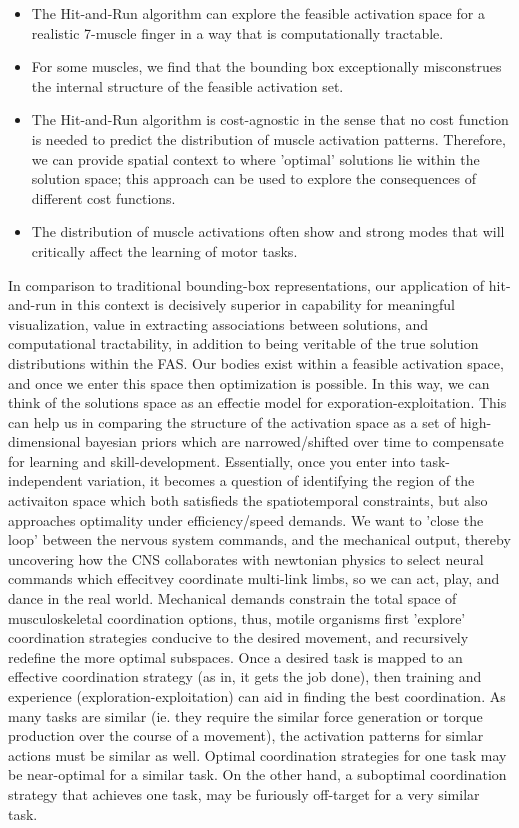 \begin{itemize}
	\item{The Hit-and-Run algorithm can explore the feasible activation space for a realistic 7-muscle finger in a way that is computationally tractable.}
	\item{For some muscles, we find that the bounding box exceptionally misconstrues the internal structure of the feasible activation set.}
	\item{The Hit-and-Run algorithm is cost-agnostic in the sense that no cost function is needed to predict the distribution of muscle activation patterns. Therefore, we can provide spatial context to where 'optimal' solutions lie within the solution space; this approach can be used to explore the consequences of different cost functions.}
	\item{The distribution of muscle activations often show and strong modes that will critically affect the learning of motor tasks.}
\end{itemize}
In comparison to traditional bounding-box representations, our application of hit-and-run in this context is decisively superior in capability for meaningful visualization, value in extracting associations between solutions, and computational tractability, in addition to being veritable of the true solution distributions within the FAS. Our bodies exist within a feasible activation space, and once we enter this space then optimization is possible. In this way, we can think of the solutions space as an effectie model for exporation-exploitation.
This can help us in comparing the structure of the activation space as a set of high-dimensional bayesian priors which are narrowed/shifted over time to compensate for learning and skill-development.
Essentially, once you enter into task-independent variation, it becomes a question of identifying the region of the activaiton space which both satisfieds the spatiotemporal constraints, but also approaches optimality under efficiency/speed demands.
We want to 'close the loop' between the nervous system commands, and the mechanical output, thereby uncovering how the CNS collaborates with newtonian physics to select neural commands which effecitvey coordinate multi-link limbs, so we can act, play, and dance in the real world.
Mechanical demands constrain the total space of musculoskeletal coordination options, thus, motile organisms first 'explore' coordination strategies conducive to the desired movement, and recursively redefine the more optimal subspaces.
Once a desired task is mapped to an effective coordination strategy (as in, it gets the job done), then training and experience (exploration-exploitation) can aid in finding the best coordination.
As many tasks are similar (ie. they require the similar force generation or torque production over the course of a movement),  the activation patterns for simlar actions must be similar as well.
Optimal coordination strategies for one task may be near-optimal for a similar task.
On the other hand, a suboptimal coordination strategy that achieves one task, may be furiously off-target for a very similar task.



